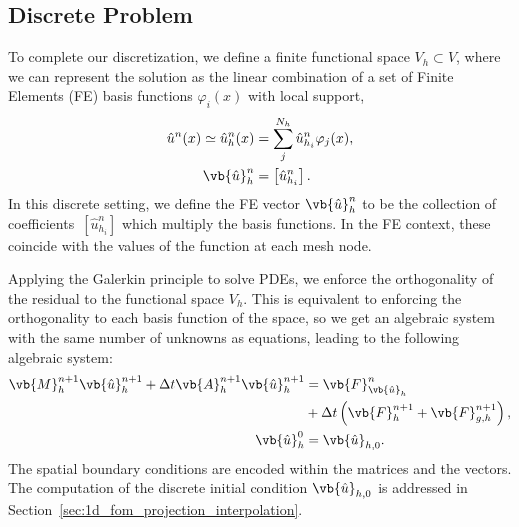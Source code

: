 \documentclass[../../main.tex]{subfiles}
\begin{document}
\subsection{Discrete Problem}
To complete our discretization, we define a finite functional space $V_h \subset V$, where we can represent the solution as the linear combination of a set of Finite Elements (FE) basis functions $\varphi_i(x)$ with local support,
\begin{align}
    \hat{u}^{n}(x) \simeq \hat{u}_h^n(x) &= \sum_j^{N_h} \hat{u}_{h_i}^n \varphi_j(x), \\
    \vb{\hat{u}}_h^{n} &= \left[\hat{u}_{h_i}^n\right].
\end{align}
In this discrete setting, we define the FE vector $\vb{\hat{u}}_h^{n}$ to be the collection of coefficients~$[\hat{u}_{h_i}^n]$ which multiply the basis functions.
In the FE context, these coincide with the values of the function at each mesh node.

Applying the Galerkin principle to solve PDEs, we enforce the orthogonality of the residual to the functional space $V_h$. 
This is equivalent to enforcing the orthogonality to each basis function of the space, so we get an algebraic system with the same number of unknowns as equations, leading to the following algebraic system:
\begin{subequations}
    \begin{align}
        \label{eq:1d_fom_weak_formulation_discrete}
        \vb{M}^{n+1}_h \vb{\hat{u}}_{h}^{n+1} + \Delta t \vb{A}^{n+1}_h \vb{\hat{u}}_{h}^{n+1} &= \vb{F}^{n}_{\vb{\hat{u}}_h} \\
        &+ \Delta t \left(\vb{F}_h^{n+1} + \vb{F}_{g,h}^{n+1}\right), \nonumber \\
        \vb{\hat{u}}_h^{0} &= \vb{\hat{u}}_{h,0}.
    \end{align}
\end{subequations}
The spatial boundary conditions are encoded within the matrices and the vectors. 
The computation of the discrete initial condition $\vb{\hat{u}}_{h,0}$ is addressed in Section~\ref{sec:1d_fom_projection_interpolation}.
\end{document}
